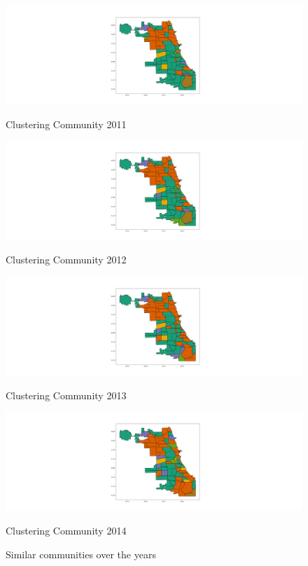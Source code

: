 \documentclass{article}
\begin{document}
\begin{figure}[!htb]
  \includegraphics[width=\linewidth]{my_similarity_2011.png}
  \caption{Clustering Community 2011}\label{fig:similarity_2011}
\endminipage\hfill
{}
  \includegraphics[width=\linewidth]{my_similarity_2012.png}
  \caption{Clustering Community 2012}\label{fig:similarity_2012}
\endminipage\hfill
{}%
  \includegraphics[width=\linewidth]{my_similarity_2013.png}
  \caption{Clustering Community 2013}\label{fig:similarity_2013}
\endminipage
{}%
  \includegraphics[width=\linewidth]{my_similarity_2014.png}
  \caption{Clustering Community 2014}\label{fig:similarity_2014}
\endminipage
\caption{Similar communities over the years}
\end{figure}
\end{document}
